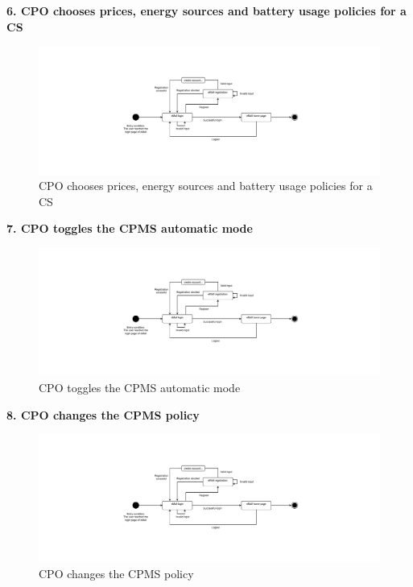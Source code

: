 \documentclass[11pt]{article}
\begin{document}
\begin{description}
    \item \textbf{6. CPO chooses prices, energy sources and battery usage policies for a CS}
    \begin{figure}[!ht]
        \includegraphics[page={6}, width=\linewidth, trim=6cm 5cm 6cm 5cm, clip]{StateCharts.pdf}
        \caption{CPO chooses prices, energy sources and battery usage policies for a CS}
    \end{figure}
    
    \item \textbf{7. CPO toggles the CPMS automatic mode}
    \begin{figure}[!ht]
        \includegraphics[page={7}, width=\linewidth, trim=10cm 5cm 10cm 5cm, clip]{StateCharts.pdf}
        \caption{CPO toggles the CPMS automatic mode}
    \end{figure}
    
    \item \textbf{8. CPO changes the CPMS policy}
    \begin{figure}[!ht]
        \includegraphics[page={8}, width=\linewidth, trim=6.8cm 5cm 7cm 5cm, clip]{StateCharts.pdf}
        \caption{CPO changes the CPMS policy}
    \end{figure}
\end{description}
\end{document}
